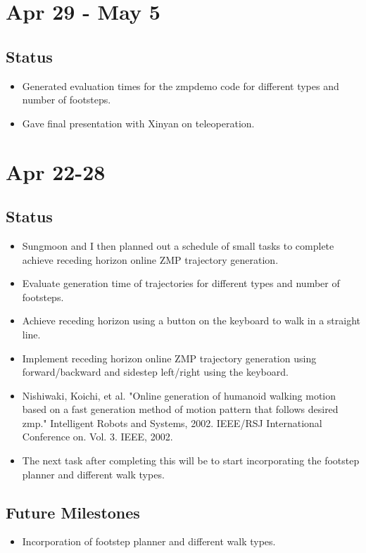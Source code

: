 \documentclass[letterpaper, 10 pt]{report}
\begin{document}
\section*{Apr 29 - May 5}
\subsection*{Status}
\begin{itemize}
\item Generated evaluation times for the zmpdemo code for different types and
number of footsteps.
\item Gave final presentation with Xinyan on teleoperation.
\end{itemize}

\section*{Apr 22-28}
\subsection*{Status}
\begin{itemize}
\item Sungmoon and I then planned out a schedule of small tasks to complete
achieve receding horizon online ZMP trajectory generation.
\item Evaluate generation time of trajectories for different types and number of
footsteps.
\item Achieve receding horizon using a button on the keyboard to walk in a straight
line.
\item Implement receding horizon online ZMP trajectory generation using
forward/backward and sidestep left/right using the keyboard.
\item Nishiwaki, Koichi, et al. "Online generation of humanoid walking motion based on
a fast generation method of motion pattern that follows desired zmp."
Intelligent Robots and Systems, 2002. IEEE/RSJ International Conference on. Vol.
3. IEEE, 2002.
\item The next task after completing this will be to start incorporating the footstep
planner and different walk types.
\end{itemize}
\subsection{Future Milestones}
\begin{itemize}
\item Incorporation of footstep planner and different walk types.
\end{itemize}
\end{document}
